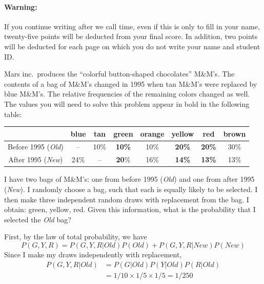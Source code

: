 \documentclass[addpoints,12pt]{exam}
\begin{document}
\paragraph{Warning:} If you continue writing after we call time, even if this is only to fill in your name, twenty-five points will be deducted from your final score. In addition, two points will be deducted for each page on which you do not write your name and student ID. 

\newpage

\begin{questions}


  \question[35] Mars inc.\ produces the ``colorful button-shaped chocolates'' M\&M's.
  The contents of a bag of M\&M's changed in 1995 when tan M\&M's were replaced by blue M\&M's.
  The relative frequencies of the remaining colors changed as well.
  The values you will need to solve this problem appear in bold in the following table:
  \begin{center}
    \begin{tabular}{c|ccccccc}
      & blue & tan & \textbf{green} & orange & \textbf{yellow} & \textbf{red} & brown \\
      \hline
      Before 1995 (\emph{Old}) & -- & 10\% & \textbf{10\%} & 10\% & \textbf{20\%} & \textbf{20\%} & 30\% \\
      After 1995 (\emph{New}) & 24\%& -- & \textbf{20}\% & 16\% & \textbf{14\%} & \textbf{13\%} & 13\%
    \end{tabular}
  \end{center}
  I have two bags of M\&M's: one from before 1995 (\emph{Old}) and one from after 1995 (\emph{New}).
I randomly choose a bag, such that each is equally likely to be selected.
I then make three independent random draws with replacement from the bag. 
I obtain: green, yellow, red.
Given this information, what is the probability that I selected the \emph{Old} bag?
\begin{solution}[6in]
First, by the law of total probability, we have
\[P(G,Y,R) = P(G,Y,R|Old)P(Old) + P(G,Y,R|New)P(New)\]
Since I make my draws independently with replacement,
\begin{align*}
P(G,Y,R|Old) &= P(G|Old)P(Y|Old)P(R|Old)\\
&= 1/10 \times 1/5 \times 1/5 = 1/250

\end{align*}
\end{solution}
\end{questions}
\end{document}

